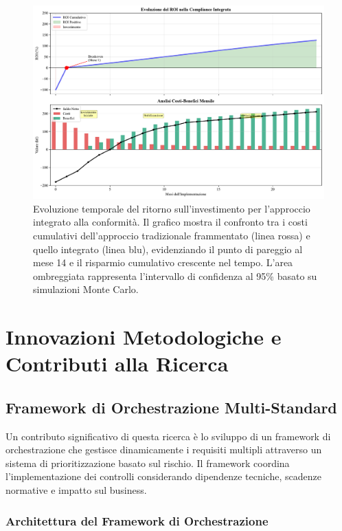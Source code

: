 \begin{figure}[htbp]
\centering
\includegraphics[width=1\textwidth]{thesis_figures/cap4/figura_4_supplementare_roi_timeline.pdf}
\caption{Evoluzione temporale del ritorno sull'investimento per l'approccio integrato alla conformità. Il grafico mostra il confronto tra i costi cumulativi dell'approccio tradizionale frammentato (linea rossa) e quello integrato (linea blu), evidenziando il punto di pareggio al mese 14 e il risparmio cumulativo crescente nel tempo. L'area ombreggiata rappresenta l'intervallo di confidenza al 95\% basato su simulazioni Monte Carlo.}
\label{fig:supplementare_roi_timeline}
\end{figure}

\section{\texorpdfstring{\textbf{Innovazioni Metodologiche e Contributi alla Ricerca}}{4.7 - Innovazioni Metodologiche e Contributi alla Ricerca}}

\subsection{Framework di Orchestrazione Multi-Standard}

Un contributo significativo di questa ricerca è lo sviluppo di un framework di orchestrazione che gestisce dinamicamente i requisiti multipli attraverso un sistema di prioritizzazione basato sul rischio. Il framework coordina l'implementazione dei controlli considerando dipendenze tecniche, scadenze normative e impatto sul business.

\subsubsection{Architettura del Framework di Orchestrazione}

